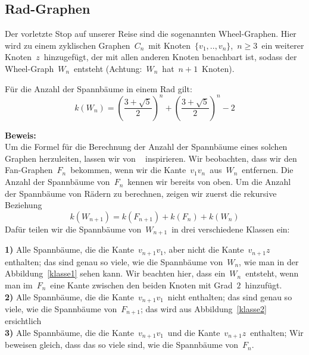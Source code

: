 \subsection{Rad-Graphen}
Der vorletzte Stop auf unserer Reise sind die sogenannten Wheel-Graphen. Hier wird zu einem zyklischen Graphen $\,C_n\,$ mit Knoten $\,\{v_1,..,v_n\}$,\; $\,n \geq 3\,$ ein weiterer Knoten $\,z\,$ hinzugefügt, der mit allen anderen Knoten benachbart ist, sodass der Wheel-Graph $\,W_{n}\,$ entsteht (Achtung: $\,W_n\,$ hat $\,n+1\,$ Knoten).
\begin{Tm}
Für die Anzahl der Spannbäume in einem Rad gilt:
\begin{equation}
 \mathit{k}\left(W_n\right) = \left(\frac{3+\sqrt{5}}{2}\right)^n+\left(\frac{3+\sqrt{5}}{2}\right)^n-2
 \label{wn}
\end{equation}
\end{Tm}
\textbf{Beweis:}\\
Um die Formel für die Berechnung der Anzahl der Spannbäume eines solchen Graphen herzuleiten, lassen wir von ~\cite{sedlacek_1970} inspirieren.
Wir beobachten, dass wir den Fan-Graphen $\,F_n\,$ bekommen, wenn wir die Kante $\,v_1v_n\,$ aus $\,W_n\,$ entfernen.
Die Anzahl der Spannbäume von $\,F_n\,$ kennen wir bereits von oben.
Um die Anzahl der Spannbäume von Rädern zu berechnen, zeigen wir zuerst die rekursive Beziehung
\begin{equation*}
 \mathit{k}\left(W_{n+1}\right) = \mathit{k}\left(F_{n+1}\right) + \mathit{k}\left(F_n\right) + \mathit{k}\left(W_n\right)
\end{equation*}
Dafür teilen wir die Spannbäume von $\,W_{n+1}\,$ in drei verschiedene Klassen ein:\\
\par
\begingroup
\leftskip=20pt
\rightskip=20pt
\noindent
\textbf{1)} Alle Spannbäume, die die Kante $\,v_{n+1}v_1$,\; aber nicht die Kante $\,v_{n+1}z\,$ enthalten; das sind genau so viele, wie die Spannbäume von $\,W_n$,\; wie man in der Abbildung~\ref{klasse1} sehen kann. Wir beachten hier, dass ein $\,W_n\,$ entsteht, wenn man im $\,F_n\,$ eine Kante zwischen den beiden Knoten mit Grad $\,2\,$ hinzufügt.\\
\textbf{2)} Alle Spannbäume, die die Kante $\,v_{n+1}v_1\,$ nicht enthalten; das sind genau so viele, wie die Spannbäume von $\,F_{n+1}$; das wird aus Abbildung~\ref{klasse2} ersichtlich\\
\textbf{3)} Alle Spannbäume, die die Kante $\,v_{n+1}v_1\,$ und die Kante $\,v_{n+1}z\,$ enthalten; Wir beweisen gleich, dass das so viele sind, wie die Spannbäume von $\,F_n$.\; \\

